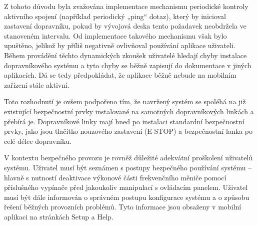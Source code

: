 Z tohoto důvodu byla zvažována implementace mechanismu periodické kontroly aktivního spojení (například periodický „ping“ dotaz), který by inicioval zastavení dopravníku, pokud by vývojová deska tento požadavek neobdržela ve stanoveném intervalu. Od implementace takového mechanismu však bylo upuštěno, jelikož by příliš negativně ovlivňoval používání aplikace uživateli. Během provádění těchto dynamických zkoušek uživatelé hledají chyby instalace dopravníkového systému a tyto chyby se běžně zapisují do dokumentace v jiných aplikacích. Dá se tedy předpokládat, že aplikace běžně nebude na mobilním zařízení stále aktivní.

Toto rozhodnutí je ovšem podpořeno tím, že navržený systém se spoléhá na již existující bezpečnostní prvky instalované na samotných dopravníkových linkách a přebírá je. Dopravníkové linky mají hned po instalaci standardní bezpečnostní prvky, jako jsou tlačítko nouzového zastavení (E-STOP) a bezpečnostní lanka po celé délce dopravníku.

V kontextu bezpečného provozu je rovněž důležité adekvátní proškolení uživatelů systému. Uživatel musí být seznámen s postupy bezpečného používání systému – hlavně s nutností deaktivace výkonové části frekvenčního měniče pomocí příslušného vypínače před jakoukoliv manipulací s ovládacím panelem. Uživatel musí být dále informován o správném postupu konfigurace systému a o způsobu řešení běžných provozních problémů. Tyto informace jsou obsaženy v mobilní aplikaci na stránkách Setup a Help.